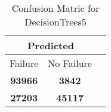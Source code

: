 \begin{table}[] 
\caption{Confusion Matric for DecisionTrees5} 
\label{Table: Prediction Accuracy-DMDDecisionTrees5OnlySunEKF-ignoreReflectionEKF-top2-Reflection} 
\centering 
\begin{tabular} 
 {@{}ccc@{}} 
\toprule 
\multicolumn{2}{c}{\textbf{Predicted}}
 \\ \midrule 
\multicolumn{1}{|c|}{Failure} & 
\multicolumn{1}{c|}{No Failure}
 \\ \midrule 
\multicolumn{1}{|c|}{\color{green}\textbf{93966}} & 
\multicolumn{1}{c|}{\color{red}\textbf{3842}}
 \\ \midrule 
\multicolumn{1}{|c|}{\color{red}\textbf{27203}} & 
\multicolumn{1}{c|}{\color{green}\textbf{45117}}
 \\ \bottomrule 
\end{tabular} 
\end{table} 
